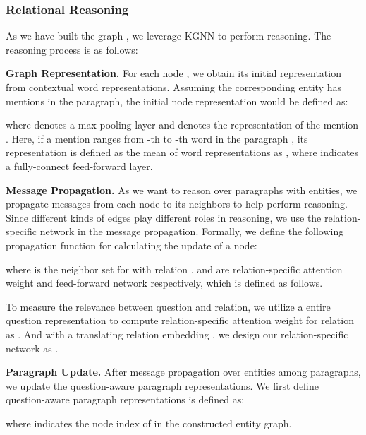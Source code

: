 \documentclass[11pt,a4paper]{article}
\newcommand\OurModel{KGNN\xspace}
\begin{document}
\subsubsection{Relational Reasoning} 
As we have built the graph , we leverage \OurModel to perform reasoning. The reasoning process is as follows:



\textbf{Graph Representation.} For each node , we obtain its initial representation from contextual word representations. Assuming the corresponding entity has  mentions in the paragraph, the initial node representation  would be defined as:

where  denotes a max-pooling layer and  denotes the representation of the mention . Here, if a mention  ranges from -th to -th word in the paragraph , its representation is defined as the mean of word representations as , where  indicates a fully-connect feed-forward layer. 











\textbf{Message Propagation.}
As we want to reason over paragraphs with entities, we propagate messages from each node to its neighbors to help perform reasoning. Since different kinds of edges play different roles in reasoning, we use the relation-specific network in the message propagation.
Formally, we define the following propagation function for calculating the update of a node:

where  is the neighbor set for  with relation .  and  are relation-specific attention weight and feed-forward network respectively, which is defined as follows.

To measure the relevance between question and relation, we utilize a entire question representation  to compute relation-specific attention weight for relation  as . And with a translating relation embedding , we design our relation-specific network as .







\textbf{Paragraph Update.} After message propagation over entities among paragraphs, we update the question-aware paragraph representations. We first define question-aware paragraph representations  is defined as:

where  indicates the node index of  in the constructed entity graph. 
\end{document}
